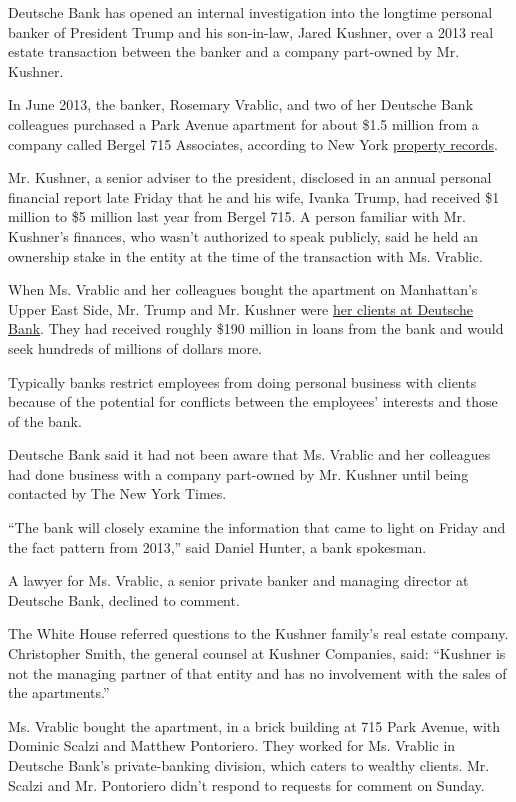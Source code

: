 Deutsche Bank has opened an internal investigation into the longtime
personal banker of President Trump and his son-in-law, Jared Kushner,
over a 2013 real estate transaction between the banker and a company
part-owned by Mr. Kushner.

In June 2013, the banker, Rosemary Vrablic, and two of her Deutsche Bank
colleagues purchased a Park Avenue apartment for about \$1.5 million
from a company called Bergel 715 Associates, according to New York
\href{https://a836-acris.nyc.gov/DS/DocumentSearch/DocumentDetail?doc_id=2013062601437001}{property
records}.

Mr. Kushner, a senior adviser to the president, disclosed in an annual
personal financial report late Friday that he and his wife, Ivanka
Trump, had received \$1 million to \$5 million last year from Bergel
715. A person familiar with Mr. Kushner's finances, who wasn't
authorized to speak publicly, said he held an ownership stake in the
entity at the time of the transaction with Ms. Vrablic.

When Ms. Vrablic and her colleagues bought the apartment on Manhattan's
Upper East Side, Mr. Trump and Mr. Kushner were
\href{https://www.nytimes3xbfgragh.onion/2020/02/04/magazine/deutsche-bank-trump.html}{her
clients at Deutsche Bank}. They had received roughly \$190 million in
loans from the bank and would seek hundreds of millions of dollars more.

Typically banks restrict employees from doing personal business with
clients because of the potential for conflicts between the employees'
interests and those of the bank.

Deutsche Bank said it had not been aware that Ms. Vrablic and her
colleagues had done business with a company part-owned by Mr. Kushner
until being contacted by The New York Times.

``The bank will closely examine the information that came to light on
Friday and the fact pattern from 2013,'' said Daniel Hunter, a bank
spokesman.

A lawyer for Ms. Vrablic, a senior private banker and managing director
at Deutsche Bank, declined to comment.

The White House referred questions to the Kushner family's real estate
company. Christopher Smith, the general counsel at Kushner Companies,
said: ``Kushner is not the managing partner of that entity and has no
involvement with the sales of the apartments.''

Ms. Vrablic bought the apartment, in a brick building at 715 Park
Avenue, with Dominic Scalzi and Matthew Pontoriero. They worked for Ms.
Vrablic in Deutsche Bank's private-banking division, which caters to
wealthy clients. Mr. Scalzi and Mr. Pontoriero didn't respond to
requests for comment on Sunday.

